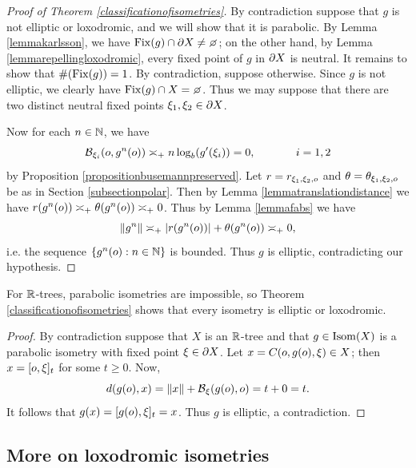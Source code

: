 \begin{proof}[Proof of Theorem \ref{classificationofisometries}]
By contradiction suppose that $g$ is not elliptic or loxodromic, and we will show that it is parabolic. By Lemma \ref{lemmakarlsson}, we have $\Fix(g)\cap\del X\neq\emptyset$; on the other hand, by Lemma \ref{lemmarepellingloxodromic}, every fixed point of $g$ in $\partial X$ is neutral. It remains to show that $\#(\operatorname{Fix}(g)) = 1$. By contradiction, suppose otherwise. Since $g$ is not elliptic, we clearly have $\Fix(g)\cap X = \emptyset$. Thus we may suppose that there are two distinct neutral fixed points $\xi_1,\xi_2\in\partial X$.

Now for each $n\in\N$, we have
\[
\operatorname{\mathcal B}_{\xi_i}(o,g^n(o)) \asymp_+ n\log_b(g'(\xi_i)) = 0, \hspace{.5 in} i = 1,2
\]
by Proposition \ref{propositionbusemannpreserved}. Let $r = r_{\xi_1,\xi_2,o}$ and $\theta = \theta_{\xi_1,\xi_2,o}$ be as in Section \ref{subsectionpolar}. Then by Lemma \ref{lemmatranslationdistance} we have $r(g^n(o))\asymp_+ \theta(g^n(o)) \asymp_+ 0$. Thus by Lemma \ref{lemmafabs} we have
\[
\|g^n\| \asymp_+ |r(g^n(o))| + \theta(g^n(o)) \asymp_+ 0,
\]
i.e. the sequence $\{g^n(\zero):n\in\N\}$ is bounded. Thus $g$ is elliptic, contradicting our hypothesis.
\end{proof}


\begin{remark}
\label{remarkparabolicRtree}
For $\R$-trees, parabolic isometries are impossible, so Theorem \ref{classificationofisometries} shows that every isometry is elliptic or loxodromic.
\end{remark}
\begin{proof}
By contradiction suppose that $X$ is an $\R$-tree and that $g\in\operatorname{Isom}(X)$ is a parabolic isometry with fixed point $\xi\in\partial X$. Let $x = C(o,g(o),\xi)\in X$; then $x = [o,\xi]_t$ for some $t\geq 0$. Now,
\[
d(g(o),x) = \|x\| + \operatorname{\mathcal B}_\xi(g(o),o) = t + 0 = t.
\]
It follows that $g(x) = [g(o),\xi]_t = x$. Thus $g$ is elliptic, a contradiction.
\end{proof}



\subsection{More on loxodromic isometries}

